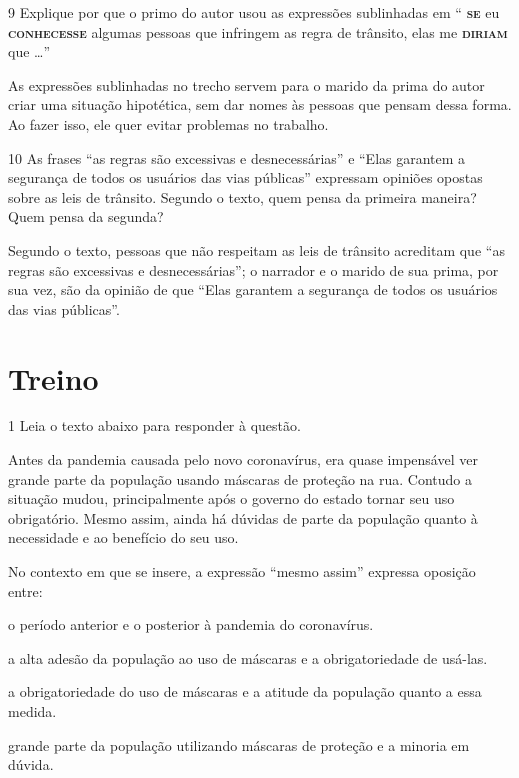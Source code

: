 \num{9} Explique por que o primo do autor usou as expressões sublinhadas em  
`` \textsc{\textbf{se}} eu \textsc{\textbf{conhecesse}} algumas pessoas que 
infringem as regra de trânsito, elas me \textsc{\textbf{diriam}} que \ldots{}''

\reduline{} As expressões sublinhadas no trecho servem para o marido da prima
do autor criar uma situação hipotética, sem dar nomes às pessoas que pensam
dessa forma. Ao fazer isso, ele quer evitar problemas no trabalho. 

\num{10} As frases ``as regras são excessivas e desnecessárias'' e 
``Elas garantem a segurança de todos os usuários das vias públicas'' expressam
opiniões opostas sobre as leis de trânsito. Segundo o texto, quem pensa
da primeira maneira? Quem pensa da segunda?

\reduline{} Segundo o texto, pessoas que não respeitam as leis de trânsito 
acreditam que ``as regras são excessivas e desnecessárias''; o narrador e 
o marido de sua prima, por sua vez, são da opinião de que ``Elas garantem a
segurança de todos os usuários das vias públicas''.

\section*{Treino}

\num{1} Leia o texto abaixo para responder à questão.

\begin{myquote}

Antes da pandemia causada pelo novo coronavírus, era quase impensável
ver grande parte da população usando máscaras de proteção na rua.
Contudo a situação mudou, principalmente após o governo do estado tornar
seu uso obrigatório. Mesmo assim, ainda há dúvidas de parte da população
quanto à necessidade e ao benefício do seu uso.


\end{myquote}

No contexto em que se insere, a expressão ``mesmo assim'' expressa oposição entre:

\begin{escolha}

  \item o período anterior e o posterior à pandemia do coronavírus.

  \item a alta adesão da população ao uso de máscaras e a obrigatoriedade de usá-las.

  \item a obrigatoriedade do uso de máscaras e a atitude da população quanto a essa medida.

  \item grande parte da população utilizando máscaras de proteção e a minoria em dúvida.

\end{escolha}

